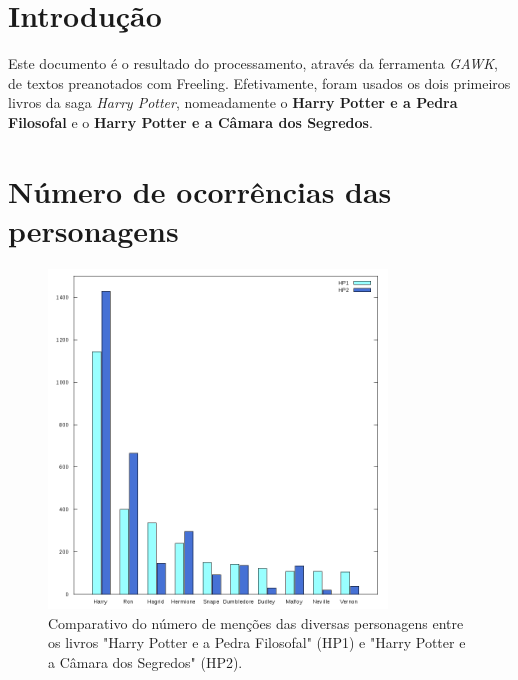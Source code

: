 \documentclass[a4paper]{article}
\begin{document}
\section{Introdução}
Este documento é o resultado do processamento, através da ferramenta \textit{GAWK}, de textos preanotados com Freeling. Efetivamente, foram usados os dois primeiros livros da saga \textit{Harry Potter}, nomeadamente o \textbf{Harry Potter e a Pedra Filosofal} e o \textbf{Harry Potter e a Câmara dos Segredos}.
\section{Número de ocorrências das personagens}
\begin{figure}[h!]
\centering
\includegraphics[width=9cm]{./imagens/output.png}
\caption{Comparativo do número de menções das diversas personagens entre os livros "Harry Potter e a Pedra Filosofal" (HP1) e "Harry Potter e a Câmara dos Segredos" (HP2).}
\label{fig:plot}
\end{figure}
\end{document}
